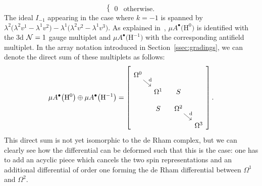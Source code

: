 \documentclass[pdftex]{sigma}
\numberwithin{equation}{section}
\def\bu{\bullet}
\def\d{{\rm d}}
\begin{document}
\begin{eg}
\begin{equation*}
\begin{cases}
	0 & \text{otherwise.}
	\end{cases}
	\end{equation*}
	The ideal $I_{-1}$ appearing in the case where $k=-1$ is spanned by $\lambda^2 \big(\lambda^2 v^1 - \lambda^1 v^2\big) - \lambda^1\big(\lambda^2 v^2 - \lambda^1 v^3\big)$. As explained in~\cite{perspectives}, $\mu A^\bullet\big(\mathrm H^0\big)$ is identified with the 3d $\mathcal N=1$ gauge multiplet and $\mu A^\bullet\big(\mathrm H^{-1}\big)$ with the corresponding antifield multiplet. In the array notation introduced in Section~\ref{ssec:gradings}, we can denote the direct sum of these multiplets as follows:
	\begin{equation*}
	\mu A^\bu\big(\mathrm H^0\big) \oplus \mu A^\bu\big(\mathrm H^{-1}\big) = \left[
	\begin{tikzcd}[column sep = 0.3cm , row sep = 0.3cm]
	\Omega^0 \arrow[dr ,"\d"] & & \\
	& \Omega^1 & S \\
	& S & \Omega^2 \arrow[dr , "\d"] \\
	& & & \Omega^3
	\end{tikzcd} \right].
	\end{equation*}
	This direct sum is not yet isomorphic to the de Rham complex, but we can clearly see how the differential can be deformed such that this is the case: one has to add an acyclic piece which cancels the two spin representations and an additional differential of order one forming the de Rham differential between $\Omega^1$ and $\Omega^2$.
	

\end{eg}
\end{document}
